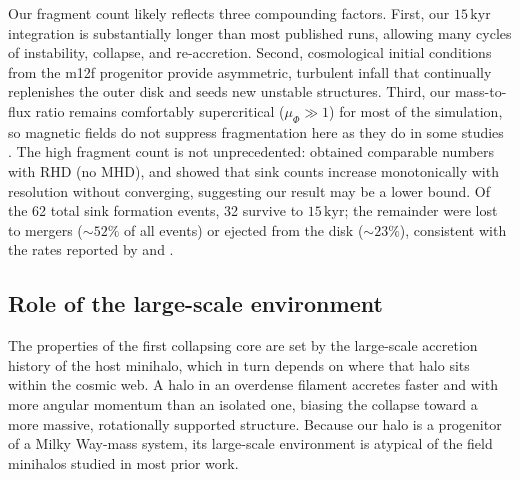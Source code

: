 \documentclass[twocolumn]{openjournal}
\newcommand{\kyr}{\,\mathrm{kyr}}
\begin{document}
Our fragment count likely reflects three compounding factors.
First, our $15\kyr$ integration is substantially longer than most
published runs, allowing many cycles of instability, collapse, and
re-accretion.
Second, cosmological initial conditions from the m12f progenitor
provide asymmetric, turbulent infall that continually replenishes
the outer disk and seeds new unstable structures.
Third, our mass-to-flux ratio remains comfortably supercritical
($\mu_\Phi \gg 1$) for most of the simulation, so magnetic fields
do not suppress fragmentation here as they do in some studies
\citep{stacy22, machida25}.
The high fragment count is not unprecedented: \citet{latif_khochfar22}
obtained comparable numbers with RHD (no MHD), and
\citet{prole22} showed that sink counts increase monotonically with
resolution without converging, suggesting our result may be a lower
bound.
Of the 62 total sink formation events, 32 survive to $15\kyr$; the
remainder were lost to mergers ($\sim 52\%$ of all events) or ejected
from the disk ($\sim 23\%$), consistent with the rates reported by
\citet{stacy12} and \citet{wollenberg20}.

\subsection{Role of the large-scale environment}

The properties of the first collapsing core are set by the large-scale accretion history of the host minihalo, which in turn depends on where that halo sits within the cosmic web.
A halo in an overdense filament accretes faster and with more angular momentum than an isolated one, biasing the collapse toward a more massive, rotationally supported structure.
Because our halo is a progenitor of a Milky Way-mass system, its large-scale environment is atypical of the field minihalos studied in most prior work.
\end{document}
